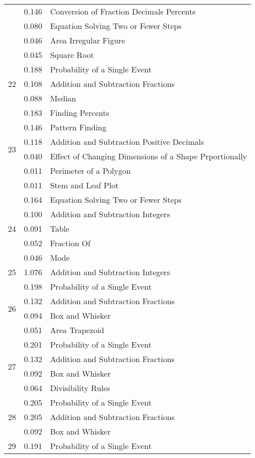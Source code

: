 \begin{longtable}[c]{|c|c|l|}
 & 0.146 & Conversion of Fraction Decimals Percents \\
 & 0.080 & Equation Solving Two or Fewer Steps \\
 & 0.046 & Area Irregular Figure \\
 & 0.045 & Square Root \\
\hline
\multirow{3}{*}{22} & 0.188 & Probability of a Single Event \\
 & 0.108 & Addition and Subtraction Fractions \\
 & 0.088 & Median \\
\hline
\multirow{6}{*}{23} & 0.183 & Finding Percents \\
 & 0.146 & Pattern Finding  \\
 & 0.118 & Addition and Subtraction Positive Decimals \\
 & 0.040 & Effect of Changing Dimensions of a Shape Prportionally \\
 & 0.011 & Perimeter of a Polygon \\
 & 0.011 & Stem and Leaf Plot \\
\hline
\multirow{5}{*}{24} & 0.164 & Equation Solving Two or Fewer Steps \\
 & 0.100 & Addition and Subtraction Integers \\
 & 0.091 & Table \\
 & 0.052 & Fraction Of \\
 & 0.046 & Mode \\
\hline
\multirow{1}{*}{25} & 1.076 & Addition and Subtraction Integers \\
\hline
\multirow{4}{*}{26} & 0.198 & Probability of a Single Event \\
 & 0.132 & Addition and Subtraction Fractions \\
 & 0.094 & Box and Whisker \\
 & 0.051 & Area Trapezoid \\
\hline
\multirow{4}{*}{27} & 0.201 & Probability of a Single Event \\
 & 0.132 & Addition and Subtraction Fractions \\
 & 0.092 & Box and Whisker \\
 & 0.064 & Divisibility Rules \\
\hline
\multirow{3}{*}{28} & 0.205 & Probability of a Single Event \\
 & 0.205 & Addition and Subtraction Fractions \\
 & 0.092 & Box and Whisker \\
\hline
\multirow{3}{*}{29} & 0.191 & Probability of a Single Event \\

\end{longtable}

